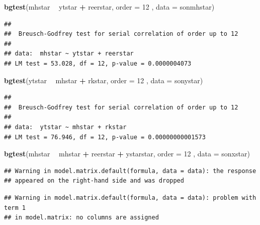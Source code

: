 \documentclass[]{article}
\newenvironment{Shaded}{\begin{snugshade}}{\end{snugshade}}
\newcommand{\KeywordTok}[1]{\textcolor[rgb]{0.13,0.29,0.53}{\textbf{#1}}}
\newcommand{\DataTypeTok}[1]{\textcolor[rgb]{0.13,0.29,0.53}{#1}}
\newcommand{\DecValTok}[1]{\textcolor[rgb]{0.00,0.00,0.81}{#1}}
\newcommand{\StringTok}[1]{\textcolor[rgb]{0.31,0.60,0.02}{#1}}
\newcommand{\OperatorTok}[1]{\textcolor[rgb]{0.81,0.36,0.00}{\textbf{#1}}}
\newcommand{\NormalTok}[1]{#1}
\begin{document}
\begin{Shaded}
\begin{Highlighting}[]
\KeywordTok{bgtest}\NormalTok{(mhstar }\OperatorTok{~}\StringTok{ }\NormalTok{ytstar }\OperatorTok{+}\StringTok{ }\NormalTok{reerstar, }\DataTypeTok{order =} \DecValTok{12}\NormalTok{ , }\DataTypeTok{data =}\NormalTok{ sonmhstar)}
\end{Highlighting}
\end{Shaded}

\begin{verbatim}
## 
##  Breusch-Godfrey test for serial correlation of order up to 12
## 
## data:  mhstar ~ ytstar + reerstar
## LM test = 53.028, df = 12, p-value = 0.0000004073
\end{verbatim}

\begin{Shaded}
\begin{Highlighting}[]
\KeywordTok{bgtest}\NormalTok{(ytstar }\OperatorTok{~}\StringTok{ }\NormalTok{mhstar }\OperatorTok{+}\StringTok{ }\NormalTok{rkstar, }\DataTypeTok{order =} \DecValTok{12}\NormalTok{ , }\DataTypeTok{data =}\NormalTok{ sonystar)}
\end{Highlighting}
\end{Shaded}

\begin{verbatim}
## 
##  Breusch-Godfrey test for serial correlation of order up to 12
## 
## data:  ytstar ~ mhstar + rkstar
## LM test = 76.946, df = 12, p-value = 0.00000000001573
\end{verbatim}

\begin{Shaded}
\begin{Highlighting}[]
\KeywordTok{bgtest}\NormalTok{(mhstar }\OperatorTok{~}\StringTok{ }\NormalTok{mhstar }\OperatorTok{+}\StringTok{ }\NormalTok{reerstar }\OperatorTok{+}\StringTok{ }\NormalTok{ystarstar, }\DataTypeTok{order =} \DecValTok{12}\NormalTok{ , }\DataTypeTok{data =}\NormalTok{ sonxstar)}
\end{Highlighting}
\end{Shaded}

\begin{verbatim}
## Warning in model.matrix.default(formula, data = data): the response
## appeared on the right-hand side and was dropped
\end{verbatim}

\begin{verbatim}
## Warning in model.matrix.default(formula, data = data): problem with term 1
## in model.matrix: no columns are assigned
\end{verbatim}
\end{document}
